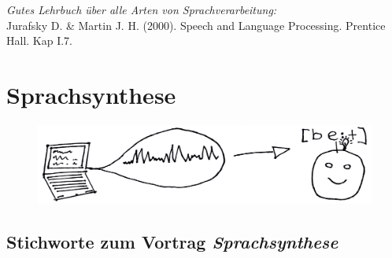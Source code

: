 \documentclass[11pt]{book}
\begin{document}



        {\em Gutes Lehrbuch über alle Arten von Sprachverarbeitung:}\\
        Jurafsky D. \& Martin J. H. (2000). Speech and Language Processing. 
	Prentice Hall. Kap I.7.





\chapter{Sprachsynthese}


\begin{figure}[htbp]
\begin{center}
\includegraphics[width=\textwidth]{grafiken/sprachsynthese/synthese}
\label{ts}
\end{center}
\end{figure}

\section{Stichworte zum Vortrag \em{Sprachsynthese}}
\end{document}
